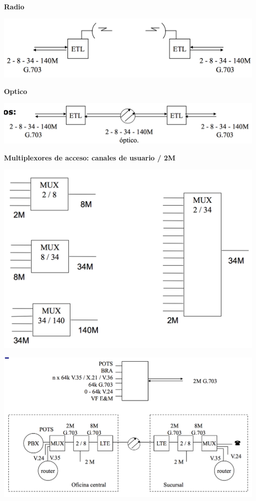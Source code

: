 \documentclass[10pt,portrait, twocolumn]{article}
\begin{document}
\textbf{Radio}

	\begin{center}
		\includegraphics[scale=0.2]{images/Radio}
	\end{center}

\textbf{Optico}

	\begin{center}
		\includegraphics[scale=0.2]{images/Optico}
	\end{center}

\textbf{Multiplexores de acceso: canales de usuario / 2M}

	\begin{center}
		\includegraphics[scale=0.2]{images/Mux}
	\end{center}

	\begin{center}
		\includegraphics[scale=0.2]{images/MuxTerminal}
	\end{center}
\end{document}
